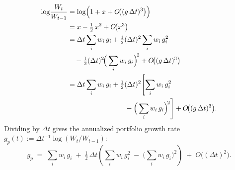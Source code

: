 \begin{align}
  \log\!\frac{W_t}{W_{t-1}}
   &= \log\!\Big(1 + x + O\!\big((g\,\Delta t)^3\big)\Big) \notag \\
   &= x - \tfrac{1}{2}\, x^2 + O\!\big(x^3\big) \notag \\
   &= \Delta t \sum_{i} w_i\, g_i
        + \tfrac{1}{2}(\Delta t)^2 \sum_{i} w_i\, g_i^2
        \notag \\
   &\quad - \tfrac{1}{2}(\Delta t)^2
        \!\Big(\sum_{i} w_i\, g_i\Big)^{\!2}
        + O\!\big((g\,\Delta t)^3\big) \notag \\
   &= \Delta t \sum_{i} w_i\, g_i
        + \tfrac{1}{2}(\Delta t)^2 \!\left[\sum_{i} w_i\, g_i^2
        \right. \notag \\
   &\hspace{8em}\left.{}- \Big(\sum_{i} w_i\, g_i\Big)^{\!2}\right]
        + O\!\big((g\,\Delta t)^3\big).
  \label{eq:rp-taylor}
\end{align}
Dividing by $\Delta t$ gives the annualized portfolio growth rate $g_p(t) := \Delta t^{-1}\log(W_t/W_{t-1})$:
\begin{equation}
  g_p \;=\; \sum_{i} w_i\, g_i
   \;+\; \tfrac{1}{2}\,\Delta t \!\left(\sum_{i} w_i\, g_i^2
        \;-\; \Big(\sum_{i} w_i\, g_i\Big)^{\!2}\right)
   \;+\; O\!\big((\Delta t)^2\big).
  \label{eq:gp-onestep}
\end{equation}

